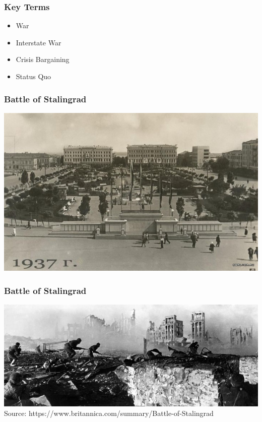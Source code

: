 \documentclass[handout]{beamer}
\begin{document}
\begin{frame} 
	\frametitle{\LARGE{Key Terms}}
	\begin{itemize}
		\item War 
		\item Interstate War
		\item Crisis Bargaining
		\item Status Quo
	\end{itemize}
\end{frame}

\begin{frame} 
	\frametitle{\LARGE{Battle of Stalingrad}}	
	\centering
	\includegraphics[width=\textwidth,height=0.85\textheight,keepaspectratio]{Stalingradpre.jpg}
\end{frame}

\begin{frame} 
	\frametitle{\LARGE{Battle of Stalingrad}}	
	\centering
	\includegraphics[width=\textwidth,height=0.9\textheight,keepaspectratio]{Stalingrad.jpg}
	\tiny Source:  https://www.britannica.com/summary/Battle-of-Stalingrad
\end{frame}
\end{document}
